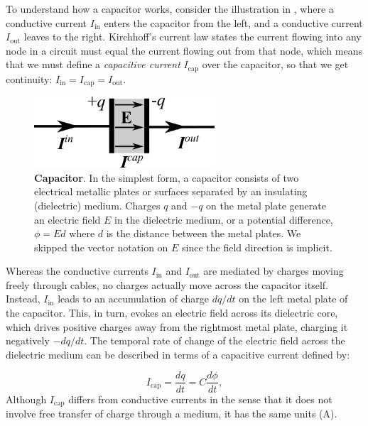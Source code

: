 To understand how a capacitor works, consider the illustration in , where a conductive current $I_\text{in}$ enters the capacitor from the left, and a conductive current $I_\text{out}$ leaves to the right. Kirchhoff's current law states the current flowing into any node in a circuit must equal the current flowing out from that node, which means that we must define
a \textit{capacitive current} $I_\text{cap}$ over the capacitor, so that we get continuity: $I_\text{in} = I_\text{cap} = I_\text{out}$. 

\begin{figure}[!ht]
\begin{center}
\includegraphics[width=0.6\textwidth]{Figures/Basics/Capacitor.png}
\end{center}
\caption{{\bf Capacitor}.  In the simplest form, a capacitor consists of two electrical metallic plates or surfaces separated by an insulating (dielectric) medium. Charges $q$ and $-q$ on the metal plate generate an electric field $E$ in the dielectric medium, or a potential difference, $\phi = Ed$ where $d$ is the distance between the metal plates. We skipped the vector notation on $E$ since the field direction is implicit.
}
\label{fig:Basics:Capacitor}
\end{figure}

Whereas the conductive currents $I_\text{in}$ and $I_\text{out}$ are mediated by charges moving freely through cables, no charges actually move across the capacitor itself. Instead, $I_\text{in}$ leads to an accumulation of charge $dq/dt$ on the left metal plate of the capacitor. This, in turn, evokes an electric field across its dielectric core, which drives positive charges away from the rightmost metal plate, charging it negatively $-dq/dt$. The temporal rate of change of the electric field across the dielectric medium can be described in terms of a capacitive current defined by:

\begin{equation}
I_\text{cap} = \frac{dq}{dt} = C\frac{d\phi}{dt}, 
\label{eq:Basics:Icap}
\end{equation}
Although $I_\text{cap}$ differs from conductive currents in the sense that it does not involve free transfer of charge through a medium, it has the same units (A). 

